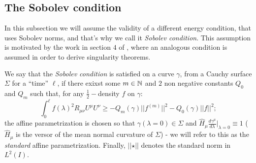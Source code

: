 \subsection{The Sobolev condition}
In this subsection we will assume the validity of a different energy condition, that uses Sobolev norms, and that's why we call it \emph{Sobolev condition}.
This assumption is motivated by the work in section \(4\) of \cite{fewster2020new}, where an analogous condition is assumed in order to derive singularity theorems.

\begin{definition}
	We say that the \emph{Sobolev condition} is satisfied on a curve \(\gamma\), from a Cauchy surface \(\Sigma\) for a ``time'' \(\ell\), if there exixst some \(m\in {\mathbb{N}}\) and \(2\) non negative constants \(Q_0\) and \(Q_m\) such that, for any \(\frac{1}{2}-\)density \(f\) on \(\gamma\):
	\[
		\int_0^{\ell} f(\lambda)^2 R_{\mu\nu}U^{\mu}U^{\nu} \ge -Q_m(\gamma) \vert\vert f^{(m)}\vert\vert^2 - Q_0(\gamma) \vert\vert f\vert\vert^2;
	\]
	the affine parametrization is chosen so that \(\gamma(\lambda = 0) \in \Sigma\) and \(\hat{H}_{\mu}\frac{d\gamma^{\mu}}{d\lambda}\Big\vert_{\lambda = 0} \equiv 1\) (\(\hat{H}_{\mu}\) is the versor of the mean normal curvature of \(\Sigma\)) - we will refer to this as the \emph{standard} affine parametrization. Finally, \(\vert\vert \star \vert\vert\) denotes the standard norm in \(L^2(I)\).
\end{definition}

